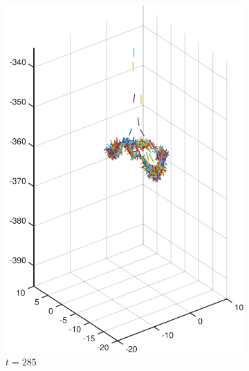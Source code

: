 \documentclass[a4paper,11pt]{kth-mag}
\begin{document}
\begin{figure}[!htbp]
\begin{subfigure}[h]{0.45\textwidth}
    \includegraphics[width=\textwidth]{img/sphere_00150.pdf}
    \caption{$t=285$}\label{fig:sphere_simulation_1c}
  \end{subfigure}
  \begin{subfigure}[h]{0.45\textwidth}
    \centering

\end{subfigure}
\end{figure}
\end{document}
